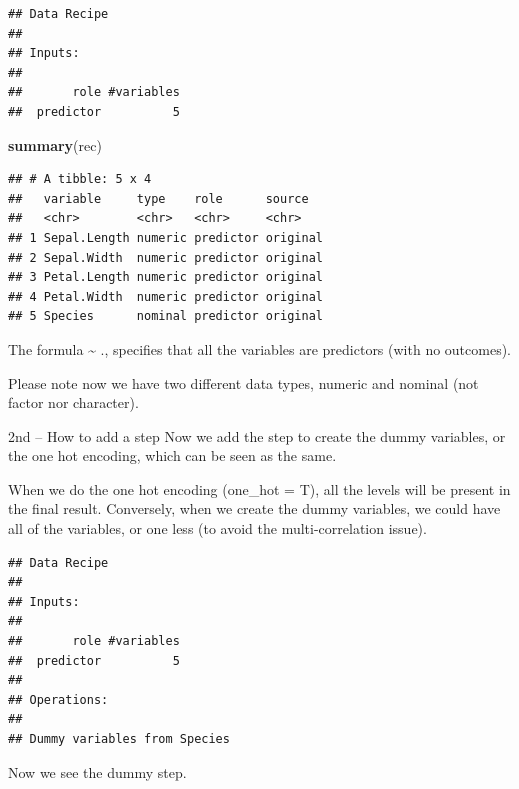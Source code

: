 \documentclass[]{article}
\newenvironment{Shaded}{\begin{snugshade}}{\end{snugshade}}
\newcommand{\KeywordTok}[1]{\textcolor[rgb]{0.13,0.29,0.53}{\textbf{#1}}}
\newcommand{\DataTypeTok}[1]{\textcolor[rgb]{0.13,0.29,0.53}{#1}}
\newcommand{\DecValTok}[1]{\textcolor[rgb]{0.00,0.00,0.81}{#1}}
\newcommand{\StringTok}[1]{\textcolor[rgb]{0.31,0.60,0.02}{#1}}
\newcommand{\OperatorTok}[1]{\textcolor[rgb]{0.81,0.36,0.00}{\textbf{#1}}}
\newcommand{\NormalTok}[1]{#1}
\begin{document}
\begin{verbatim}
## Data Recipe
## 
## Inputs:
## 
##       role #variables
##  predictor          5
\end{verbatim}

\begin{Shaded}
\begin{Highlighting}[]
\KeywordTok{summary}\NormalTok{(rec)}
\end{Highlighting}
\end{Shaded}

\begin{verbatim}
## # A tibble: 5 x 4
##   variable     type    role      source  
##   <chr>        <chr>   <chr>     <chr>   
## 1 Sepal.Length numeric predictor original
## 2 Sepal.Width  numeric predictor original
## 3 Petal.Length numeric predictor original
## 4 Petal.Width  numeric predictor original
## 5 Species      nominal predictor original
\end{verbatim}

The formula \textasciitilde{} ., specifies that all the variables are
predictors (with no outcomes).

Please note now we have two different data types, numeric and nominal
(not factor nor character).

2nd -- How to add a step Now we add the step to create the dummy
variables, or the one hot encoding, which can be seen as the same.

When we do the one hot encoding (one\_hot = T), all the levels will be
present in the final result. Conversely, when we create the dummy
variables, we could have all of the variables, or one less (to avoid the
multi-correlation issue).

\begin{Shaded}
\end{Shaded}

\begin{verbatim}
## Data Recipe
## 
## Inputs:
## 
##       role #variables
##  predictor          5
## 
## Operations:
## 
## Dummy variables from Species
\end{verbatim}

Now we see the dummy step.
\end{document}
